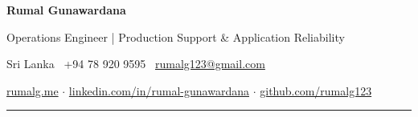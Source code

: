 \begin{center}
{\Huge\bfseries Rumal Gunawardana}\par
\vspace{0.12cm}
{\large\color{primary} Operations Engineer | Production Support \& Application Reliability}\par
\vspace{0.24cm}
Sri Lanka \textbar\
+94 78 920 9595 \textbar\
\href{mailto:rumalg123@gmail.com}{rumalg123@gmail.com}\par
\vspace{0.10cm}
\href{https://rumalg.me}{rumalg.me}
\quad$\cdot$\quad
\href{https://www.linkedin.com/in/rumal-gunawardana}{linkedin.com/in/rumal-gunawardana}
\quad$\cdot$\quad
\href{https://github.com/rumalg123}{github.com/rumalg123}
\end{center}
\vspace{0.12cm}
\hrule
\vspace{0.20cm}
